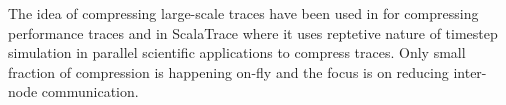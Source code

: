 
The idea of compressing large-scale  traces have been used in \cite{eventflowgraph} for compressing performance traces and in ScalaTrace\cite{scalatrace} where it uses reptetive nature of timestep simulation in parallel scientific applications to compress traces\cite{freitag}. Only small fraction of compression is happening on-fly and the focus is on reducing inter-node communication. 